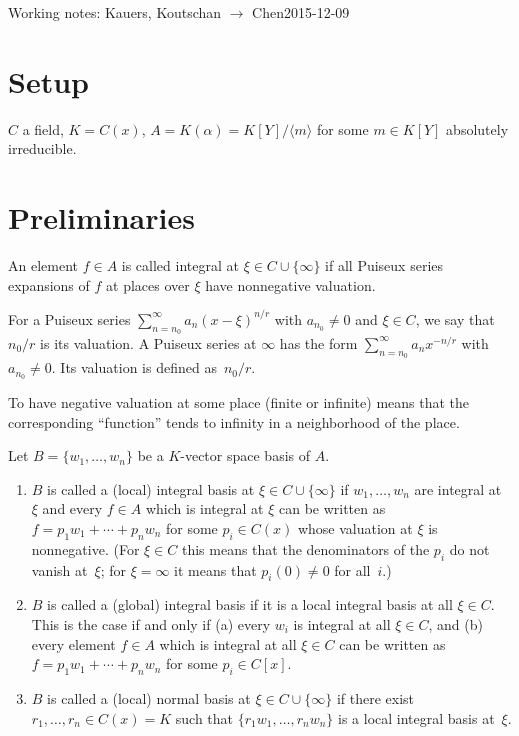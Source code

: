 \documentclass[a4paper,draft]{article}
\def\<#1>{\langle#1\rangle}
\begin{document}
Working notes: Kauers, Koutschan $\to$ Chen\hfill 2015-12-09

\section{Setup}

$C$ a field, $K=C(x)$, $A=K(\alpha)=K[Y]/\<m>$ for some $m\in K[Y]$ absolutely irreducible. 

\section{Preliminaries}

An element $f\in A$ is called integral at $\xi\in C\cup\{\infty\}$ if all
Puiseux series expansions of $f$ at places over $\xi$ have nonnegative
valuation.

For a Puiseux series $\sum_{n=n_0}^\infty a_n(x-\xi)^{n/r}$ with $a_{n_0}\neq0$
and $\xi\in C$, we say that $n_0/r$ is its valuation. A Puiseux series at
$\infty$ has the form $\sum_{n=n_0}^\infty a_n x^{-n/r}$ with $a_{n_0}\neq0$.
Its valuation is defined as~$n_0/r$.

To have negative valuation at some place (finite or infinite) means that the
corresponding ``function'' tends to infinity in a neighborhood of the place.

Let $B=\{w_1,\dots,w_n\}$ be a $K$-vector space basis of $A$.
\begin{enumerate}
\item $B$ is called a (local) integral basis
at $\xi\in C\cup\{\infty\}$ if $w_1,\dots,w_n$ are integral at $\xi$ and every
$f\in A$ which is integral at $\xi$ can be written as $f=p_1w_1+\cdots+p_nw_n$
for some $p_i\in C(x)$ whose valuation at $\xi$ is nonnegative. (For $\xi\in C$
this means that the denominators of the $p_i$ do not vanish at~$\xi$; for $\xi=\infty$
it means that $p_i(0)\neq0$ for all~$i$.)
\item $B$ is called a (global) integral basis
if it is a local integral basis at all $\xi\in C$. This is the case if and only if
(a) every $w_i$ is integral at all $\xi\in C$, and
(b) every element $f\in A$ which is integral at all $\xi\in C$ can be written
as $f=p_1w_1+\cdots+p_nw_n$ for some $p_i\in C[x]$.
\item $B$ is called a (local) normal basis at $\xi\in C\cup\{\infty\}$ if there
  exist $r_1,\dots,r_n\in C(x)=K$ such that $\{r_1w_1,\dots,r_nw_n\}$ is a local
  integral basis at~$\xi$.
\end{enumerate}
\end{document}
